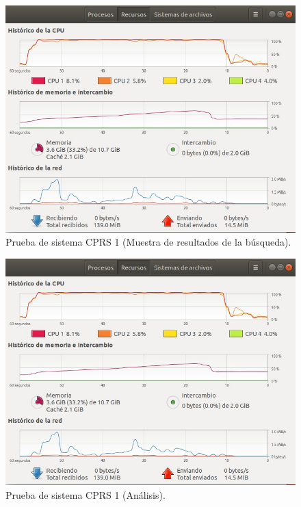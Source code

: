 \begin{figure}[H]
    \centering
    \includegraphics[scale=0.60]{Capitulo4/Documentos/Casos_de_sistema/imagenes_casos/ResultBusquedaErik.jpeg}
    \caption{Prueba de sistema CPRS 1 (Muestra de resultados de la búsqueda).}
    \label{Evidencia2_1-1}
\end{figure}


\begin{figure}[H]
    \centering
    \includegraphics[scale=0.60]{Capitulo4/Documentos/Casos_de_sistema/imagenes_casos/ResultBusquedaErik.jpeg}
    \caption{Prueba de sistema CPRS 1 (Análisis).}
    \label{Evidencia2_1-2}
\end{figure}

